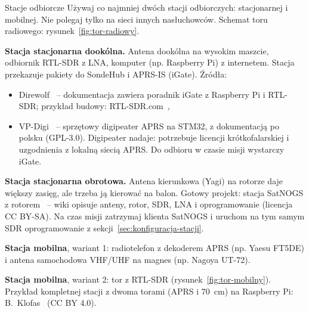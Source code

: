 \begin{sekcja}{Stacje odbiorcze}\label{sec:stacje}
Używaj co najmniej dwóch stacji odbiorczych: stacjonarnej i mobilnej. Nie polegaj tylko na sieci innych nasłuchowców. Schemat toru radiowego: rysunek~\ref{fig:tor-radiowy}.

\textbf{Stacja stacjonarna dookólna.} Antena dookólna na wysokim maszcie, odbiornik RTL-SDR z LNA, komputer (np. Raspberry Pi) z internetem. Stacja przekazuje pakiety do SondeHub i APRS-IS (iGate). Źródła:
\begin{itemize}
  \item Direwolf~\cite{direwolf} -- dokumentacja zawiera poradnik iGate z Raspberry Pi i RTL-SDR; przykład budowy: RTL-SDR.com~\cite{rtlsdrigate},
  \item VP-Digi~\cite{vpdigi} -- sprzętowy digipeater APRS na STM32, z dokumentacją po polsku (GPL-3.0). Digipeater nadaje: potrzebuje licencji krótkofalarskiej i uzgodnienia z lokalną siecią APRS. Do odbioru w czasie misji wystarczy iGate.
\end{itemize}

\textbf{Stacja stacjonarna obrotowa.} Antena kierunkowa (Yagi) na rotorze daje większy zasięg, ale trzeba ją kierować na balon. Gotowy projekt: stacja SatNOGS z rotorem~\cite{satnogsbuild} -- wiki opisuje anteny, rotor, SDR, LNA i oprogramowanie (licencja CC BY-SA). Na czas misji zatrzymaj klienta SatNOGS i uruchom na tym samym SDR oprogramowanie z sekcji~\ref{sec:konfiguracja-stacji}.

\textbf{Stacja mobilna}, wariant 1: radiotelefon z dekoderem APRS (np. Yaesu FT5DE) i antena samochodowa VHF/UHF na magnes (np. Nagoya UT-72).

\textbf{Stacja mobilna}, wariant 2: tor z RTL-SDR (rysunek~\ref{fig:tor-mobilny}). Przykład kompletnej stacji z dwoma torami (APRS i \SI{70}{cm}) na Raspberry Pi: B.~Klofas~\cite{klofasmobile} (CC BY 4.0).

\begin{blok}
\begin{center}\resizebox{\linewidth}{!}{\rysTorMobilny}\end{center}
\label{fig:tor-mobilny}
\end{blok}


\end{sekcja}
